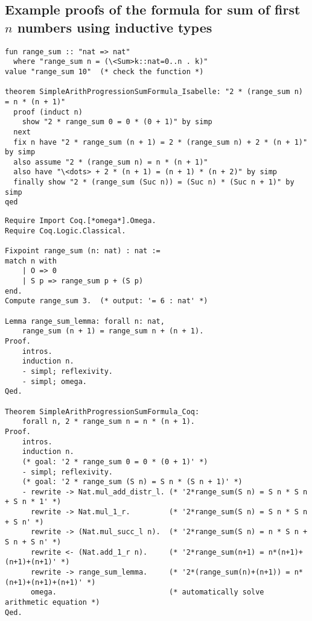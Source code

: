 \documentclass[article]{aaltoseries}
\begin{document}
\subsection{Example proofs of the formula for sum of first $n$ numbers using inductive types}
\label{apx:sum_inductive}

\begin{lstlisting}[language=isabelle, caption={Proof of the formula for sum of n first number in Isabelle}, label={ex_nat_sum_isabelle}]
fun range_sum :: "nat => nat"
  where "range_sum n = (\<Sum>k::nat=0..n . k)"
value "range_sum 10"  (* check the function *)

theorem SimpleArithProgressionSumFormula_Isabelle: "2 * (range_sum n) = n * (n + 1)"
  proof (induct n)
    show "2 * range_sum 0 = 0 * (0 + 1)" by simp
  next
  fix n have "2 * range_sum (n + 1) = 2 * (range_sum n) + 2 * (n + 1)" by simp
  also assume "2 * (range_sum n) = n * (n + 1)"
  also have "\<dots> + 2 * (n + 1) = (n + 1) * (n + 2)" by simp
  finally show "2 * (range_sum (Suc n)) = (Suc n) * (Suc n + 1)" by simp
qed
\end{lstlisting}



\begin{lstlisting}[language=coq, caption={Proof of the formula for sum of n first number in Coq}, label={ex_nat_sum_coq}]
Require Import Coq.[*omega*].Omega.
Require Coq.Logic.Classical.

Fixpoint range_sum (n: nat) : nat :=
match n with
    | O => 0
    | S p => range_sum p + (S p)
end.
Compute range_sum 3.  (* output: '= 6 : nat' *)

Lemma range_sum_lemma: forall n: nat,
    range_sum (n + 1) = range_sum n + (n + 1).
Proof.
    intros.
    induction n.
    - simpl; reflexivity.
    - simpl; omega.
Qed.

Theorem SimpleArithProgressionSumFormula_Coq:
    forall n, 2 * range_sum n = n * (n + 1).
Proof.
    intros.
    induction n.
    (* goal: '2 * range_sum 0 = 0 * (0 + 1)' *)
    - simpl; reflexivity.
    (* goal: '2 * range_sum (S n) = S n * (S n + 1)' *)
    - rewrite -> Nat.mul_add_distr_l. (* '2*range_sum(S n) = S n * S n + S n * 1' *)
      rewrite -> Nat.mul_1_r.         (* '2*range_sum(S n) = S n * S n + S n' *)
      rewrite -> (Nat.mul_succ_l n).  (* '2*range_sum(S n) = n * S n + S n + S n' *)
      rewrite <- (Nat.add_1_r n).     (* '2*range_sum(n+1) = n*(n+1)+(n+1)+(n+1)' *)
      rewrite -> range_sum_lemma.     (* '2*(range_sum(n)+(n+1)) = n*(n+1)+(n+1)+(n+1)' *)
      omega.                          (* automatically solve arithmetic equation *)
Qed.
\end{lstlisting}
\end{document}
